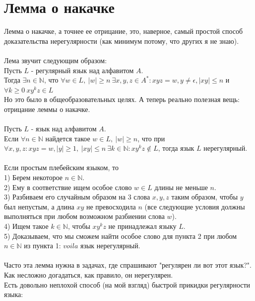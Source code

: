\documentclass[14pt]{extreport}
\begin{document}
	
	
	
	
	\chapter{Лемма о накачке}
	
	Лемма о накачке, а точнее ее отрицание, это, наверное, самый простой способ доказательства
	нерегулярности (как минимум потому, что других я не знаю).\\\\
	Лема звучит следующим образом:\\
	Пусть $L$ - регулярный язык над алфавитом $A$.\\
	Тогда $\exists n \in \mathbb{N}$, что
	$\forall w \in L,\ |w| \geq n\ \exists x,y,z \in A^*: xyz = w, y \neq \epsilon,
	|xy| \leq n$ и $\forall k \geq 0\ xy^kz \in L$\\
	Но это было в общеобразовательных целях. А теперь реально полезная вещь: отрицание
	леммы о накачке.\\\\
	Пусть $L$ - язык над алфавитом $A$.\\
	Если $\forall n \in \mathbb{N}$ найдется такое
	$w \in L,\ |w| \geq n$, что при $\forall x,y,z: xyz = w, |y| \geq 1,\
	|xy| \leq n\ \exists k \in \mathbb{N}: xy^kz \notin L$, тогда язык $L$ нерегулярный.\\\\
	Если простым плебейским языком, то\\
	1) Берем некоторое $n \in \mathbb{N}$.\\
	2) Ему в соответствие ищем особое слово $w \in L$ длины не меньше $n$.\\
	3) Разбиваем его случайным образом на 3 слова $x,y,z$ таким образом, чтобы $y$ был
	непустым, а длина $xy$ не превосходила $n$ (все следующие условия должны выполняться при
	любом возможном разбиении слова $w$).\\
	4) Ищем такое $k \in \mathbb{N}$, чтобы $xy^kz$ не принадлежал языку $L$.\\
	5) Доказываем, что мы сможем найти особое слово для пункта 2 при любом
	$n \in \mathbb{N}$ из пункта 1: $voila$ язык нерегулярный.\\\\
	Часто эта лемма нужна в задачах, где спрашивают "регулярен ли вот этот язык?".\\
	Как несложно догадаться, как правило, он нерегулярен.\\
	\newpage
	Есть довольно неплохой способ (на мой взгляд) быстрой прикидки регулярности языка:
\end{document}
